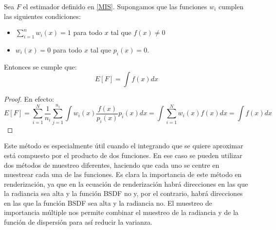 \begin{proposicion}
Sea $F$ el estimador definido en \ref{MIS}. Supongamos que las funciones $w_i$ cumplen las siguientes condiciones:
\begin{itemize}
\item $\sum_{i=1}^nw_i(x)=1$ para todo $x$ tal que $f(x)\neq 0$
\item $w_i(x) = 0$ para todo $x$ tal que $p_i(x)=0$.
\end{itemize}

Entonces se cumple que:
$$E[F] = \int f(x) dx $$

\end{proposicion}
\begin{proof}

En efecto:
$$E[F]=\sum_{i=1}^N\frac{1}{n_i}\sum_{j=1}^{n_i}\int w_i(x)\frac{f(x)}{p_i(x)}p_i(x)dx = \int \sum_{i=1}^{N} w_i(x) f(x)dx = \int f(x)dx$$

\end{proof}

Este método es especialmente útil cuando el integrando que se quiere aproximar está compuesto por el producto de dos funciones. En ese caso se pueden utilizar dos métodos de muestreo diferentes, haciendo que cada uno se centre en muestrear cada una de las funciones. Es clara la importancia de este método en renderización, ya que en la ecuación de renderización habrá direcciones en las que la radiancia sea alta y la función BSDF no y, por el contrario, habrá direcciones en las que la función BSDF sea alta y  la radiancia no. El muestreo de importancia múltiple nos permite combinar el muestreo de la radiancia y de la función de dispersión para así reducir la varianza.
